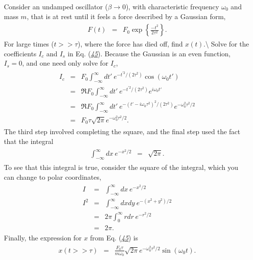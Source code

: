\documentclass[letterpaper,10pt,english]{sphinxmanual}
\begin{document}
Consider an undamped oscillator (\(\beta\rightarrow 0\)), with
characteristic frequency \(\omega_0\) and mass \(m\), that is at rest
until it feels a force described by a Gaussian form,
\begin{equation*}
\begin{split}
\begin{eqnarray*}
F(t)&=&F_0 \exp\left\{\frac{-t^2}{2\tau^2}\right\}.
\end{eqnarray*}
\end{split}
\end{equation*}
For large times (\(t>>\tau\)), where the force has died off, find
\(x(t)\).\textbackslash{} Solve for the coefficients \(I_c\) and \(I_s\) in
Eq. ({\hyperref[\detokenize{chapter4:eq:Greeny2}]{\emph{45}}}). Because the Gaussian is an even function,
\(I_s=0\), and one need only solve for \(I_c\),
\begin{equation*}
\begin{split}
\begin{eqnarray*}
I_c&=&F_0\int_{-\infty}^\infty dt'~e^{-t^{\prime 2}/(2\tau^2)}\cos(\omega_0 t')\\
&=&\Re F_0 \int_{-\infty}^\infty dt'~e^{-t^{\prime 2}/(2\tau^2)}e^{i\omega_0 t'}\\
&=&\Re F_0 \int_{-\infty}^\infty dt'~e^{-(t'-i\omega_0\tau^2)^2/(2\tau^2)}e^{-\omega_0^2\tau^2/2}\\
&=&F_0\tau \sqrt{2\pi} e^{-\omega_0^2\tau^2/2}.
\end{eqnarray*}
\end{split}
\end{equation*}
The third step involved completing the square, and the final step used the fact that the integral
\begin{equation*}
\begin{split}
\begin{eqnarray*}
\int_{-\infty}^\infty dx~e^{-x^2/2}&=&\sqrt{2\pi}.
\end{eqnarray*}
\end{split}
\end{equation*}
To see that this integral is true, consider the square of the integral, which you can change to polar coordinates,
\begin{equation*}
\begin{split}
\begin{eqnarray*}
I&=&\int_{-\infty}^\infty dx~e^{-x^2/2}\\
I^2&=&\int_{-\infty}^\infty dxdy~e^{-(x^2+y^2)/2}\\
&=&2\pi\int_0^\infty rdr~e^{-r^2/2}\\
&=&2\pi.
\end{eqnarray*}
\end{split}
\end{equation*}
Finally, the expression for \(x\) from Eq. ({\hyperref[\detokenize{chapter4:eq:Greeny2}]{\emph{45}}}) is
\begin{equation*}
\begin{split}
\begin{eqnarray*}
x(t>>\tau)&=&\frac{F_0\tau}{m\omega_0} \sqrt{2\pi} e^{-\omega_0^2\tau^2/2}\sin(\omega_0t).
\end{eqnarray*}
\end{split}
\end{equation*}
\end{document}
